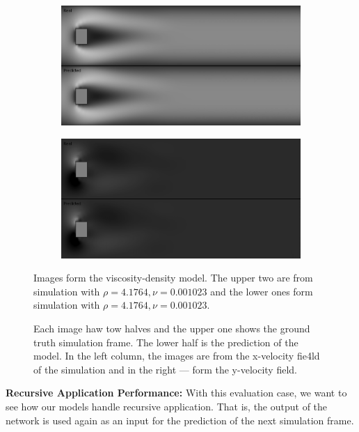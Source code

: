 \documentclass{llncs}
\begin{document}
\begin{figure}
  \begin{subfigure}{.5\textwidth}
    \centering
    \includegraphics[width=1\linewidth]{imgs/x_recursive_0_fluid_300}
  \end{subfigure}
  \begin{subfigure}{.5\textwidth}
    \centering
    \includegraphics[width=1\linewidth]{imgs/y_recursive_0_fluid_300}
  \end{subfigure}
  \begin{center}
  Images form the viscosity-density model. The upper two are from simulation with $\rho=4.1764, \nu=0.001023$ and the lower ones form simulation with $\rho=4.1764, \nu=0.001023$.
  \end{center}

  \caption{Each image haw tow halves and the upper one shows the ground truth simulation frame. The lower half is the prediction of the model. In the left column, the images are from the x-velocity fie4ld of the simulation and in the right --- form the y-velocity field.}\label{fig:single_images}
\end{figure}

\noindent\textbf{Recursive Application Performance:}
With this evaluation case, we want to see how our models handle recursive application. That is, the output of the network is used again as an input for the prediction of the next simulation frame.
\end{document}
